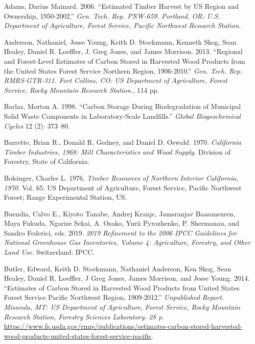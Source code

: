 \documentclass[
  openany]{book}
\newlength{\cslhangindent}
\newlength{\cslentryspacingunit} %
\newenvironment{CSLReferences}[2] %
 {%
  \setlength{\parindent}{0pt}
  \ifodd #1
  \let\oldpar\par
  \def\par{\hangindent=\cslhangindent\oldpar}
  \fi
  \setlength{\parskip}{#2\cslentryspacingunit}
 }%
 {}
\begin{document}
\hypertarget{refs}{}
\begin{CSLReferences}{1}{0}
\leavevmode{}%
Adams, Darius Mainard. 2006. {``Estimated Timber Harvest by US Region
and Ownership, 1950-2002.''} \emph{Gen. Tech. Rep. PNW-659. Portland,
OR: U.S. Department of Agriculture, Forest Service, Pacific Northwest
Research Station.}

\leavevmode{}%
Anderson, Nathaniel, Jesse Young, Keith D. Stockmann, Kenneth Skog, Sean
Healey, Daniel R. Loeffler, J. Greg Jones, and James Morrison. 2013.
{``Regional and Forest-Level Estimates of Carbon Stored in Harvested
Wood Products from the United States Forest Service Northern Region,
1906-2010.''} \emph{Gen. Tech. Rep. RMRS-GTR-311. Fort Collins, CO: US
Department of Agriculture, Forest Service, Rocky Mountain Research
Station.}, 114 pp.

\leavevmode{}%
Barlaz, Morton A. 1998. {``Carbon Storage During Biodegradation of
Municipal Solid Waste Components in Laboratory-Scale Landfills.''}
\emph{Global Biogeochemical Cycles} 12 (2): 373--80.

\leavevmode{}%
Barrette, Brian R., Donald R. Gedney, and Daniel D. Oswald. 1970.
\emph{California Timber Industries, 1968: Mill Characteristics and Wood
Supply}. Division of Forestry, State of California.

\leavevmode{}%
Bolsinger, Charles L. 1976. \emph{Timber Resources of Northern Interior
California, 1970}. Vol. 65. US Department of Agriculture, Forest
Service, Pacific Northwest Forest; Range Experimental Station, US.

\leavevmode{}%
Buendia, Calvo E., Kiyoto Tanabe, Andrej Kranjc, Jamsranjav Baasansuren,
Maya Fukuda, Ngarize Sekai, A. Osako, Yurii Pyrozhenko, P. Shermanau,
and Sandro Federici, eds. 2019. \emph{2019 Refinement to the 2006 IPCC
Guidelines for National Greenhouse Gas Inventories, Volume 4:
Agriculture, Forestry, and Other Land Use.} Switzerland: IPCC.

\leavevmode{}%
Butler, Edward, Keith D. Stockmann, Nathaniel Anderson, Ken Skog, Sean
Healey, Daniel R. Loeffler, J Greg Jones, James Morrison, and Jesse
Young. 2014. {``Estimates of Carbon Stored in Harvested Wood Products
from United States Forest Service Pacific Northwest Region,
1909-2012.''} \emph{Unpublished Report. Missoula, MT: US Department of
Agriculture, Forest Service, Rocky Mountain Research Station, Forestry
Sciences Laboratory. 28 p.}
\url{https://www.fs.usda.gov/rmrs/publications/estimates-carbon-stored-harvested-wood-products-united-states-forest-service-pacific}.


\end{CSLReferences}
\end{document}

